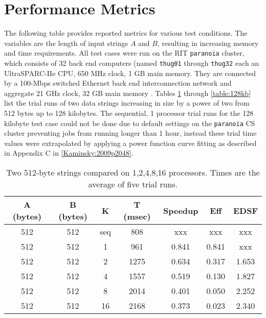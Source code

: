 \section{Performance Metrics}
\label{sec:metrics}
The following table provides reported metrics for various test conditions. The variables are the length of input strings $A$ and $B$, resulting in increasing memory and time requirements. All test cases were run on the RIT {\tt paranoia} cluster, which consists of 32 back end computers (named {\tt thug01} through {\tt thug32} each an UltraSPARC-IIe CPU, 650 MHz clock, 1 GB main memory. They are connected by a 100-Mbps switched Ethernet back end interconnection network and aggregate 21 GHz clock, 32 GB main memory \cite{running-pj}. Tables \ref{table:512b} through \ref{table:128kb} list the trial runs of two data strings increasing in size by a power of two from 512 bytes up to 128 kilobytes. The sequential, 1 processor trial runs for the 128 kilobyte test case could not be done due to default settings on the {\tt paranoia} CS cluster preventing jobs from running longer than 1 hour, instead these trial time values were extrapolated by applying a power function curve fitting as described in Appendix C in \ref{Kaminsky:2009p2048}.

\begin{table}[h]
	\begin{center}
		\begin{tabular}{ | c | c | c | c | c | c | c |}
			\hline
			A (bytes)&	B (bytes) &	K	&	T (msec)	&	Speedup	&	Eff	&	EDSF \\
			\hline																	 
			512     &	512     &	seq	&808  &	xxx		&	xxx	&	xxx  \\
			512     &	512     &	1	&961  &0.841&0.841&	xxx \\
			512     &	512     &	2	&1275 &0.634&0.317&1.653\\
			512     &	512     &	4	&1557 &0.519&0.130&1.827\\
			512     &	512     &	8	&2014 &0.401&0.050&2.252\\
			512     &	512     &	16	&2168 &0.373&0.023&2.340\\
			\hline
		\end{tabular}
	\end{center}
	\caption{Two 512-byte strings compared on {1,2,4,8,16} processors. Times are the average of five trial runs.}
	\label{table:512b}
\end{table}

